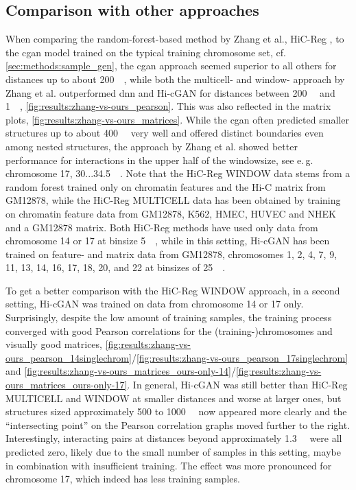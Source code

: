\subsection{Comparison with other approaches}\label{sec:results:comparison}
When comparing the random-forest-based method by Zhang et al., HiC-Reg \cite{Zhang2019}, to the \acrshort{cgan} model trained on the typical training chromosome set, cf. \ref{sec:methods:sample_gen},
the \acrshort{cgan} approach seemed superior to all others for distances up to about \SI{200}{\kilo\bp}, 
while both the multicell- and window- approach by Zhang et al. outperformed \acrshort{dnn} and Hi-cGAN for distances between 
\SI{200}{\kilo\bp} and \SI{1}{\mega\bp}, \cref{fig:results:zhang-vs-ours_pearson}.
This was also reflected in the matrix plots, \cref{fig:results:zhang-vs-ours_matrices}. 
While the \acrshort{cgan} often predicted smaller structures up to about \SI{400}{\kilo\bp} very well and offered distinct boundaries
even among nested structures, the approach by Zhang et al. showed better performance for interactions in the upper half of the windowsize,
see e.\,g. chromosome 17, 30...\SI{34.5}{\mega\bp}.
Note that the HiC-Reg WINDOW data stems from a random forest trained only on chromatin features and the Hi-C matrix from GM12878,
while the HiC-Reg MULTICELL data has been obtained by training on chromatin feature data from GM12878, K562, HMEC, HUVEC and NHEK and a GM12878 matrix.
Both HiC-Reg methods have used only data from chromosome 14 or 17 at binsize \SI{5}{\kilo\bp},
while in this setting, Hi-cGAN has been trained on feature- and matrix data from GM12878, chromosomes 1, 2, 4, 7, 9, 11, 13, 14, 16, 17, 18, 20, and 22 at binsizes of \SI{25}{\kilo\bp}.

To get a better comparison with the HiC-Reg WINDOW approach, in a second setting, Hi-cGAN was trained on data from chromosome 14 or 17 only.
Surprisingly, despite the low amount of training samples, the training process converged with good Pearson correlations for the (training\mbox{-})chromosomes and 
visually good matrices, \cref{fig:results:zhang-vs-ours_pearson_14singlechrom}/\ref{fig:results:zhang-vs-ours_pearson_17singlechrom} 
and \ref{fig:results:zhang-vs-ours_matrices_ours-only-14}/\ref{fig:results:zhang-vs-ours_matrices_ours-only-17}.
In general, Hi-cGAN was still better than HiC-Reg MULTICELL and WINDOW at smaller distances and worse at larger ones, 
but structures sized approximately 500 to \SI{1000}{\kilo\bp} now appeared more clearly and the ``intersecting point'' on the Pearson correlation graphs 
moved further to the right.
Interestingly, interacting pairs at distances beyond approximately \SI{1.3}{\kilo\bp} were all predicted zero, likely due to the small number of samples in this setting,
maybe in combination with insufficient training. 
The effect was more pronounced for chromosome 17, which indeed has less training samples.

